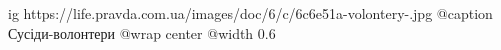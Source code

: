  
 
 
 
 

\ifcmt
  ig https://life.pravda.com.ua/images/doc/6/c/6c6e51a-volontery-.jpg
	@caption Сусіди-волонтери
  @wrap center
  @width 0.6
\fi
